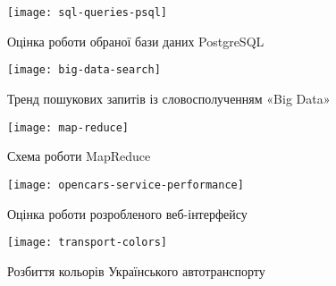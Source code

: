\chapter{}

\begin{figure}[ht]
\centering
\texttt{[image: sql-queries-psql]}
\caption{Оцінка роботи обраної бази даних PostgreSQL}
\label{fig:sql-queries-psql}
\end{figure}

\begin{figure}[ht]
\centering
\texttt{[image: big-data-search]}
\caption{Тренд пошукових запитів із словосполученням «Big Data»}
\label{fig:big-data-search}
\end{figure}

\begin{figure}[ht]
\centering
\texttt{[image: map-reduce]}
\caption{Схема роботи MapReduce}
\label{fig:map-reduce}
\end{figure}

\begin{figure}[ht]
\centering
\texttt{[image: opencars-service-performance]}
\caption{Оцінка роботи розробленого веб-інтерфейсу}
\label{fig:opencars-service-performance}
\end{figure}

\begin{figure}[ht]
\centering
\texttt{[image: transport-colors]}
\caption{Розбиття кольорів Українського автотранспорту}
\label{fig:transport-colors}
\end{figure}
